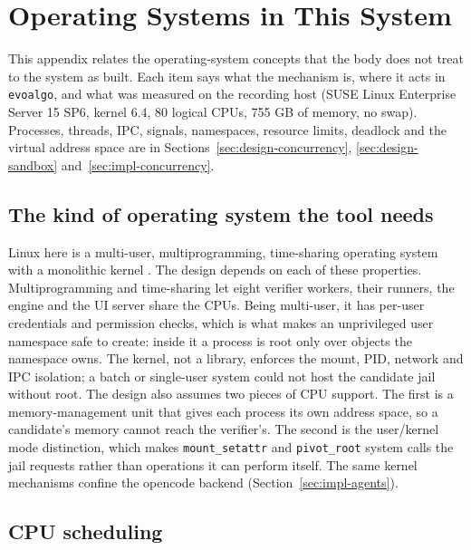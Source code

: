 \chapter{Operating Systems in This System}
\label{app:os-topics}

This appendix relates the operating-system concepts that the body does not
treat to the system as built. Each item says what
the mechanism is, where it acts in \texttt{evoalgo}, and what was measured on the
recording host (SUSE Linux Enterprise Server 15 SP6, kernel 6.4, 80 logical CPUs,
755 GB of memory, no swap). Processes, threads, IPC, signals, namespaces, resource
limits, deadlock and the virtual address space are in Sections~\ref{sec:design-concurrency},
\ref{sec:design-sandbox} and~\ref{sec:impl-concurrency}.

\section{The kind of operating system the tool needs}

Linux here is a multi-user, multiprogramming, time-sharing operating system with
a monolithic kernel \citep{silberschatz2018os,tanenbaum2015modern}. The design
depends on each of these properties. Multiprogramming and time-sharing let eight
verifier workers, their runners, the engine and the UI server share the CPUs.
Being multi-user, it has per-user credentials and permission checks, which is what
makes an unprivileged user namespace safe to create: inside it a process is root
only over objects the namespace owns. The kernel, not a library, enforces the
mount, PID, network and IPC isolation; a batch or single-user system could not
host the candidate jail without root. The design also assumes two pieces of CPU
support. The first is a memory-management unit that gives each process its own
address space, so a candidate's memory cannot reach the verifier's. The second is
the user/kernel mode distinction, which makes \texttt{mount\_setattr} and
\texttt{pivot\_root} system calls the jail requests rather than operations it can
perform itself. The same kernel mechanisms confine the opencode backend
(Section~\ref{sec:impl-agents}).

\section{CPU scheduling}

